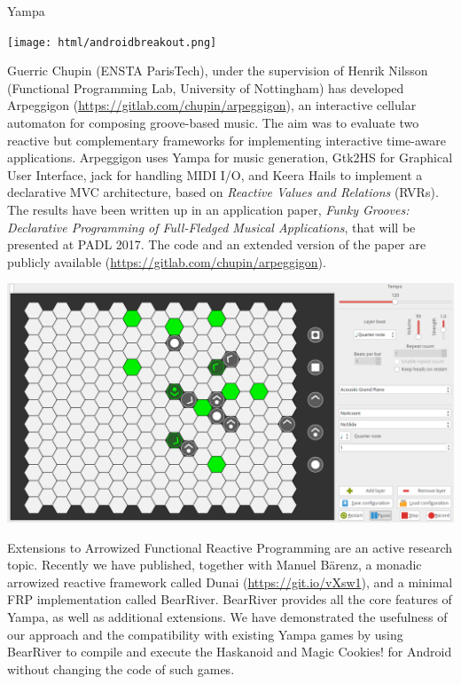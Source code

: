 \begin{hcarentry}[updated]{Yampa}
\begin{center}
\texttt{[image: html/androidbreakout.png]}
\end{center}

Guerric Chupin (ENSTA ParisTech), under the supervision of Henrik Nilsson
(Functional Programming Lab, University of Nottingham) has developed Arpeggigon
(\href{https://gitlab.com/chupin/arpeggigon}{https://gitlab.com/chupin/arpeggigon}),
an interactive cellular automaton for composing groove-based music. The aim was
to evaluate two reactive but complementary frameworks for implementing
interactive time-aware applications. Arpeggigon uses Yampa for music
generation, Gtk2HS for Graphical User Interface, jack for handling MIDI I/O,
and Keera Hails to implement a declarative MVC architecture, based on
\emph{Reactive Values and Relations} (RVRs).  The results have been written up
in an application paper, \emph{Funky Grooves: Declarative Programming of
Full-Fledged Musical Applications}, that will be presented at PADL 2017. The
code and an extended version of the paper are publicly available
(\href{https://gitlab.com/chupin/arpeggigon}{https://gitlab.com/chupin/arpeggigon}).

\begin{center}
\includegraphics[width=\linewidth]{arpeggigon.png}
\end{center}

Extensions to Arrowized Functional Reactive Programming are an active research
topic. Recently we have published, together with Manuel B\"arenz, a monadic
arrowized reactive framework called Dunai
(\href{https://git.io/vXsw1}{https://git.io/vXsw1}), and a minimal FRP
implementation called BearRiver. BearRiver provides all the core features of
Yampa, as well as additional extensions. We have demonstrated the usefulness of
our approach and the compatibility with existing Yampa games by using BearRiver
to compile and execute the Haskanoid and Magic Cookies! for Android without
changing the code of such games.


\end{hcarentry}

